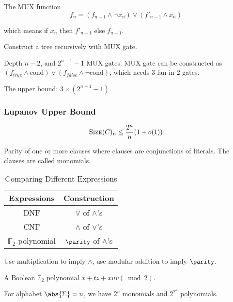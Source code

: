 The MUX function
$$f_n = ( f_{n-1} \land \lnot x_n )\lor (f'_{n-1} \land x_n)$$

which means if \(x_n\) then $f'_{n-1}$ else $f_{n-1}$.

Construct a tree recursively with MUX gate.

Depth $n-2$, and \(2^{n-1} -1\) MUX gates. MUX gate can be constructed as $(f_{true}\land \text{cond} )\lor (f_{false}\land \lnot \text{cond} )$, which needs 3 fan-in 2 gates.

The upper bound: \(3\times(2^{n-1} -1)\).

\subsubsection{Lupanov Upper Bound}

\begin{theorem}[Lupanov, 1958]
$$\text{\textsc{Size}}(C)_n \le \frac{2^n}{n}(1+o(1))$$
\end{theorem}

\begin{definition}
Parity of one or more clauses where clauses are conjunctions of literals. The clauses are called monomials.
\end{definition}

\begin{table}[ht]
        \centering
        \begin{tabular}{c|c}
        \hline
             Expressions & Construction \\\hline
             DNF & \(\lor\) of \(\land\)'s \\\hline
              CNF & \(\land\) of \(\lor\)'s \\\hline
              \(\mathbb{F}_2\) polynomial & \(\parity\) of \(\land\)'s \\\hline
        \end{tabular}
        \caption{Comparing Different Expressions}
        \label{tab:comp_f2}
    \end{table}

Use multiplication to imply $\land$, use modular addition to imply $\parity$.

\begin{example}
 A Boolean \(\mathbb{F}_2\) polynomial \(x + tz + xuv (\bmod 2)\).
\end{example}

For alphabet $\abs{\Sigma} = n$, we have \(2^n\) monomials and \(2^{2^n}\) polynomials.

